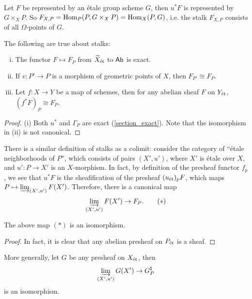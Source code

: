 \documentclass[11pt]{amsart}
\begin{document}
\begin{exm}
    Let $F$ be represented by an \'etale group scheme $G$, then $u^\ast F$ is represented by $G\times_X P$. So $F_{X,P} = \operatorname{Hom}_P(P, G\times_X P) = \operatorname{Hom}_X(P, G)$, i.e. the stalk $F_{X,P}$ consists of all $\Omega$-points of $G$. 
\end{exm}

\begin{prop}
    The following are true about stalks:
    \begin{enumerate}[(i)]
        \item The functor $F\mapsto F_P$ from $\widetilde{X}_{\operatorname{\acute{e}t}}$ to $\mathsf{Ab}$ is exact.
        \item If $v:P'\to P$ is a morphism of geometric points of $X$, then
        $F_{P'}\cong F_P$.
        \item Let $f:X\to Y$ be a map of schemes, then for any abelian sheaf $F$ on $Y_{\operatorname{\acute{e}t}}$, $(f^\ast F)_P \cong F_P$.
    \end{enumerate}
\end{prop}

\begin{proof}
    (i) Both $u^\ast$ and $\Gamma_P$ are exact (\ref{section_exact}).
    Note that the isomorphism in (ii) is not canonical.
\end{proof}

There is a similar definition of stalks as a colimit: consider the category of ``\'etale neighborhoods of $P$'', which consists of pairs $(X', u')$, where $X'$ is \'etale over $X$, and $u':P\to X'$ is an $X$-morphism. In fact, by definition of the presheaf functor $f_p$, we see that $u^\ast F$ is the sheafification of the presheaf $(u_{\operatorname{\acute{e}t}})_pF$, which maps $P\mapsto \varinjlim_{(X', u')} F(X')$. Therefore, there is a canonical map
\[\varinjlim_{(X',u')} F(X') \to F_P. \tag{$\ast$}\]

\begin{prop}
    The above map $(\ast)$ is an isomorphism.
\end{prop}

\begin{proof}
    In fact, it is clear that any abelian presheaf on $P_{\operatorname{\acute{e}t}}$ is a sheaf.
\end{proof}

\begin{prop}
    More generally, let $G$ be any presheaf on $X_{\operatorname{\acute{e}t}}$, then
    \[\varinjlim_{(X',u')} G(X') \to G_P^\sharp\]
    is an isomorphism.
\end{prop}
\end{document}
